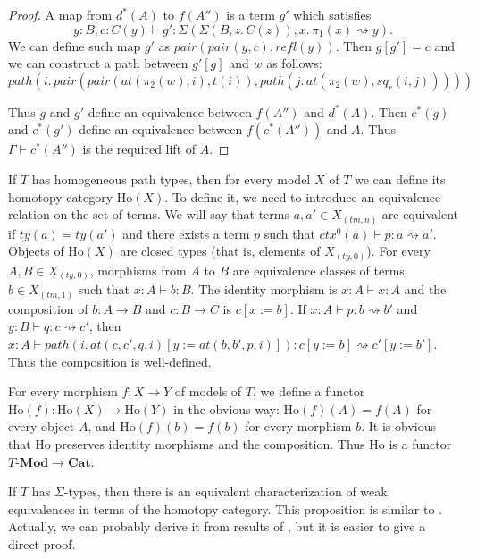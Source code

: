 \documentclass{mscs}
\newcommand{\repl}{:=}
\newcommand{\Ho}{\mathrm{Ho}}
\newcommand{\refl}{\mathit{refl}}
\newcommand{\sq}{\mathit{sq}}
\newcommand{\idtype}{\rightsquigarrow}
\newcommand{\pathI}{\mathit{path}}
\newcommand{\at}{\mathit{at}}
\newcommand{\pair}{\mathit{pair}}
\newcommand{\cat}[1]{\mathbf{#1}}
\newcommand{\Mod}[1]{#1\text{-}\cat{Mod}}
\numberwithin{figure}{section}
\begin{document}
\begin{proof}
A map from $d^*(A)$ to $f(A'')$ is a term $g'$ which satisfies
\[ y : B, c : C(y) \vdash g' : \Sigma(\Sigma(B, z.\,C(z)), x.\,\pi_1(x) \idtype y). \]
We can define such map $g'$ as $\pair(\pair(y,c),\refl(y))$.
Then $g[g'] = c$ and we can construct a path between $g'[g]$ and $w$ as follows:
\[ \pathI(i.\,\pair(\pair(\at(\pi_2(w),i), t(i)), \pathI(j.\,\at(\pi_2(w),\sq_r(i,j))))) \]

Thus $g$ and $g'$ define an equivalence between $f(A'')$ and $d^*(A)$.
Then $c^*(g)$ and $c^*(g')$ define an equivalence between $f(c^*(A''))$ and $A$.
Thus $\Gamma \vdash c^*(A'')$ is the required lift of $A$.
\end{proof}

If $T$ has homogeneous path types, then for every model $X$ of $T$ we can define its homotopy category $\Ho(X)$.
To define it, we need to introduce an equivalence relation on the set of terms.
We will say that terms $a,a' \in X_{(tm,n)}$ are equivalent if $ty(a) = ty(a')$ and there exists a term $p$ such that $ctx^0(a) \vdash p : a \idtype a'$.
Objects of $\Ho(X)$ are closed types (that is, elements of $X_{(ty,0)}$).
For every $A,B \in X_{(ty,0)}$, morphisms from $A$ to $B$ are equivalence classes of terms $b \in X_{(tm,1)}$ such that $x : A \vdash b : B$.
The identity morphism is $x : A \vdash x : A$ and the composition of $b : A \to B$ and $c : B \to C$ is $c[x \repl b]$.
If $x : A \vdash p : b \idtype b'$ and $y : B \vdash q : c \idtype c'$, then $x : A \vdash \pathI(i.\,\at(c,c',q,i)[y \repl \at(b,b',p,i)]) : c[y \repl b] \idtype c'[y \repl b']$.
Thus the composition is well-defined.

For every morphism $f : X \to Y$ of models of $T$, we define a functor $\Ho(f) : \Ho(X) \to \Ho(Y)$ in the obvious way:
$\Ho(f)(A) = f(A)$ for every object $A$, and $\Ho(f)(b) = f(b)$ for every morphism $b$.
It is obvious that $\Ho$ preserves identity morphisms and the composition.
Thus $\Ho$ is a functor $\Mod{T} \to \cat{Cat}$.

If $T$ has $\Sigma$-types, then there is an equivalent characterization of weak equivalences in terms of the homotopy category.
This proposition is similar to \cite[Th\'eor\`eme 3.25]{cis10b}.
Actually, we can probably derive it from results of \cite{cis10b}, but it is easier to give a direct proof.
\end{document}
